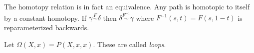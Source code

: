\documentclass[letterpaper]{article}
\begin{document}
The homotopy relation is in fact an equivalence. Any path is homotopic to itself by a constant homotopy. If $\gamma \overset{F}{\sim} \delta$ then $\delta \overset{F^{-1}}{\sim} \gamma$ where $F^{-1}(s, t) = F(s, 1-t)$ is reparameterized backwards.

Let $\Omega(X, x) = P(X, x, x)$. These are called \emph{loops}.
\end{document}
